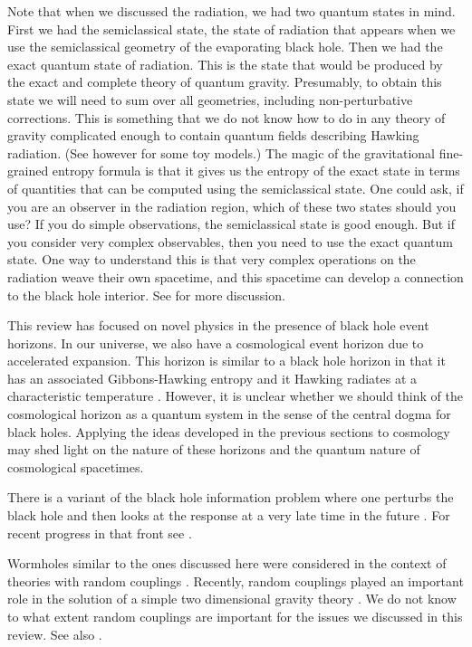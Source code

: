  
Note that when we discussed the radiation, we had  two quantum states in mind. First we had the semiclassical state, the state of radiation that appears when we use the semiclassical geometry of the evaporating black hole. Then we had the exact quantum state of radiation. This is the state that would be produced by the exact and complete theory of quantum gravity. Presumably, to obtain this state we will need to sum over all geometries, including non-perturbative corrections. This is something that we do not know how to do in any theory of gravity complicated enough to contain quantum fields describing Hawking radiation. (See however \cite{Saad:2019lba,Penington:2019kki} for some toy models.) The magic of the gravitational fine-grained entropy formula is that it gives us the entropy of the exact state in terms of quantities that can be computed using the semiclassical state. One could ask, if you are an observer in the radiation region, which of these two states should you use? If you do simple observations, the semiclassical state is good enough. But if you consider very complex observables, then you need to use the exact quantum state. One way to understand this is that very complex operations on the radiation weave their own spacetime, and this spacetime can develop a connection to the black hole interior. See \cite{Susskind:2018pmk} for more discussion. 
  

  This review has focused on novel physics in the presence of black hole event horizons. In our universe, we also have a cosmological event horizon due to accelerated expansion. This horizon is similar to a black hole horizon in that it has an associated Gibbons-Hawking entropy and it Hawking radiates at a characteristic temperature 
\cite{Figari:1975km,Gibbons:1977mu}. 
However, it is unclear whether we should think of the cosmological horizon as a quantum system in the sense of the central dogma for black holes. Applying the ideas developed in the previous sections to cosmology may shed light on the nature of these horizons and the quantum nature of cosmological spacetimes. 

   
   There is a variant of the black hole information problem where one perturbs the black hole and then looks at the response at a very late time in the future \cite{Maldacena:2001kr}.  For recent progress in that front see \cite{Saad:2018bqo,Saad:2019lba,Saad:2019pqd}.  

   
     
      Wormholes similar to the ones discussed here were considered in the context of theories with random couplings \cite{Coleman:1988cy,Giddings:1988cx,Polchinski:1994zs}. Recently, random couplings played an important role in the solution of a simple two dimensional gravity theory \cite{Saad:2018bqo,Saad:2019lba}. 
      We do not know to what extent random couplings are important for the issues we discussed in this review. See also \cite{Marolf:2020xie}.
        
